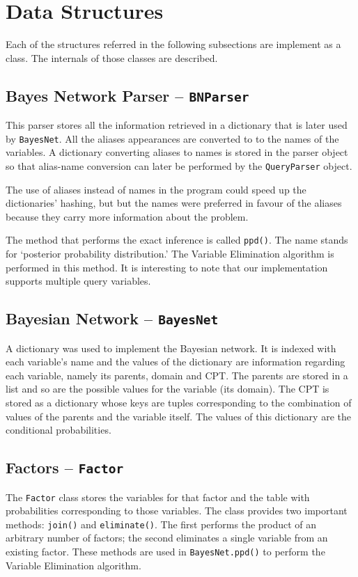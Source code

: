 \documentclass[11pt,a4paper]{article}
\begin{document}
\section{Data Structures}
Each of the structures referred in the following subsections are implement as a class. The internals of those classes are described.

\subsection{Bayes Network Parser -- \texttt{BNParser}}

This parser stores all the information retrieved in a dictionary that is later used by \texttt{BayesNet}. All the aliases appearances are converted to to the names of the variables. A dictionary converting aliases to names is stored in the parser object so that alias-name conversion can later be performed by the \texttt{QueryParser} object.

The use of aliases instead of names in the program could speed up the dictionaries' hashing, but but the names were preferred in favour of the aliases because they carry more information about the problem.

The method that performs the exact inference is called \texttt{ppd()}. The name stands for `posterior probability distribution.' The Variable Elimination algorithm is performed in this method. It is interesting to note that our implementation supports multiple query variables.

\subsection{Bayesian Network -- \texttt{BayesNet}}
A dictionary was used to implement the Bayesian network. It is indexed with each variable's name and the values of the dictionary are information regarding each variable, namely its parents, domain and CPT. The parents are stored in a list and so are the possible values for the variable (its domain). The CPT is stored as a dictionary whose keys are tuples corresponding to the combination of values of the parents and the variable itself. The values of this dictionary are the conditional probabilities.

\subsection{Factors -- \texttt{Factor}}
The \texttt{Factor} class stores the variables for that factor and the table with probabilities corresponding to those variables. The class provides two important methods: \texttt{join()} and \texttt{eliminate()}. The first performs the product of an arbitrary number of factors; the second eliminates a single variable from an existing factor. These methods are used in \texttt{BayesNet.ppd()} to perform the Variable Elimination algorithm.
\end{document}
